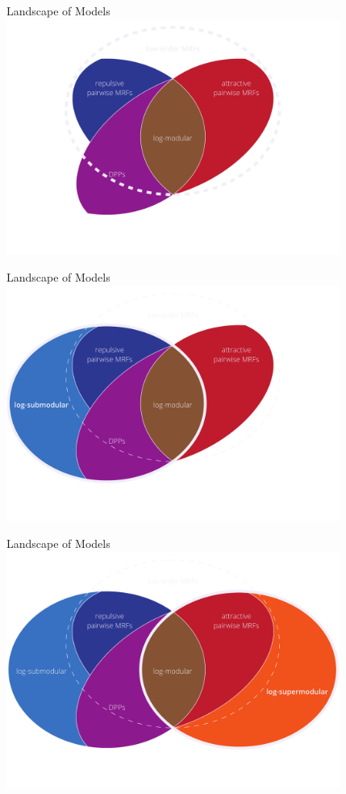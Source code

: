 \documentclass[mathserif]{beamer}
\begin{document}
\begin{frame}{Landscape of Models}
\centering
\includegraphics[width=4.3in]{figures/venn05.pdf}
\end{frame}

\begin{frame}{Landscape of Models}
\centering
\includegraphics[width=4.3in]{figures/venn06.pdf}
\end{frame}

\begin{frame}{Landscape of Models}
\centering
\includegraphics[width=4.3in]{figures/venn07.pdf}
\end{frame}
\end{document}
